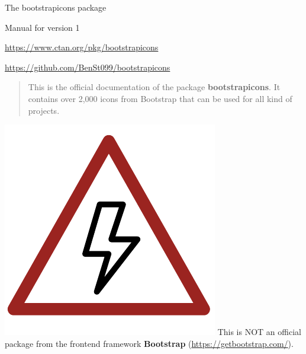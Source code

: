 \documentclass{article}
\begin{document}
\newpage
\thispagestyle{empty}
\begin{center}
    \begin{tcolorbox}[colback=white,colframe=gray-700, width=7cm,halign=center,boxrule=0.2mm]
        {\Large The {\sffamily bootstrapicons} package}

        Manual for version 1
    \end{tcolorbox}\vspace{15mm}

    \href{https://www.ctan.org/pkg/bootstrapicons}{\textcolor{blue-700}{https://www.ctan.org/pkg/bootstrapicons}}\vspace{6mm}

    \href{https://github.com/BenSt099/bootstrapicons}{\textcolor{blue-700}{https://github.com/BenSt099/bootstrapicons}}
\end{center}\vspace{7mm}

\begin{abstract}
\noindent This is the official documentation of the package \textbf{bootstrapicons}. It contains over 2,000 icons from Bootstrap that can be used for all kind of projects.
\end{abstract}\vspace{10mm}

\begin{tcolorbox}[leftrule=3mm,colback=red-200,colframe=red-800,lower separated=false,sidebyside,lefthand width=1.5cm]
    \includegraphics[scale=0.25]{danger.pdf}\tcblower {\bf\textcolor{red-800}{ATTENTION!}} This is NOT an official package from the frontend framework \textbf{Bootstrap} (\href{https://getbootstrap.com/}{\textcolor{blue-700}{https://getbootstrap.com/}}).
\end{tcolorbox}
\end{document}
